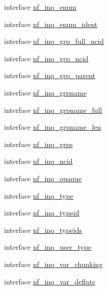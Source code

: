 \begin{DoxyCompactItemize}
\item 
interface \hyperlink{interfacenetcdf4__nf__interfaces_1_1nf__inq__enum}{nf\+\_\+inq\+\_\+enum}
\item 
interface \hyperlink{interfacenetcdf4__nf__interfaces_1_1nf__inq__enum__ident}{nf\+\_\+inq\+\_\+enum\+\_\+ident}
\item 
interface \hyperlink{interfacenetcdf4__nf__interfaces_1_1nf__inq__grp__full__ncid}{nf\+\_\+inq\+\_\+grp\+\_\+full\+\_\+ncid}
\item 
interface \hyperlink{interfacenetcdf4__nf__interfaces_1_1nf__inq__grp__ncid}{nf\+\_\+inq\+\_\+grp\+\_\+ncid}
\item 
interface \hyperlink{interfacenetcdf4__nf__interfaces_1_1nf__inq__grp__parent}{nf\+\_\+inq\+\_\+grp\+\_\+parent}
\item 
interface \hyperlink{interfacenetcdf4__nf__interfaces_1_1nf__inq__grpname}{nf\+\_\+inq\+\_\+grpname}
\item 
interface \hyperlink{interfacenetcdf4__nf__interfaces_1_1nf__inq__grpname__full}{nf\+\_\+inq\+\_\+grpname\+\_\+full}
\item 
interface \hyperlink{interfacenetcdf4__nf__interfaces_1_1nf__inq__grpname__len}{nf\+\_\+inq\+\_\+grpname\+\_\+len}
\item 
interface \hyperlink{interfacenetcdf4__nf__interfaces_1_1nf__inq__grps}{nf\+\_\+inq\+\_\+grps}
\item 
interface \hyperlink{interfacenetcdf4__nf__interfaces_1_1nf__inq__ncid}{nf\+\_\+inq\+\_\+ncid}
\item 
interface \hyperlink{interfacenetcdf4__nf__interfaces_1_1nf__inq__opaque}{nf\+\_\+inq\+\_\+opaque}
\item 
interface \hyperlink{interfacenetcdf4__nf__interfaces_1_1nf__inq__type}{nf\+\_\+inq\+\_\+type}
\item 
interface \hyperlink{interfacenetcdf4__nf__interfaces_1_1nf__inq__typeid}{nf\+\_\+inq\+\_\+typeid}
\item 
interface \hyperlink{interfacenetcdf4__nf__interfaces_1_1nf__inq__typeids}{nf\+\_\+inq\+\_\+typeids}
\item 
interface \hyperlink{interfacenetcdf4__nf__interfaces_1_1nf__inq__user__type}{nf\+\_\+inq\+\_\+user\+\_\+type}
\item 
interface \hyperlink{interfacenetcdf4__nf__interfaces_1_1nf__inq__var__chunking}{nf\+\_\+inq\+\_\+var\+\_\+chunking}
\item 
interface \hyperlink{interfacenetcdf4__nf__interfaces_1_1nf__inq__var__deflate}{nf\+\_\+inq\+\_\+var\+\_\+deflate}

\end{DoxyCompactItemize}
